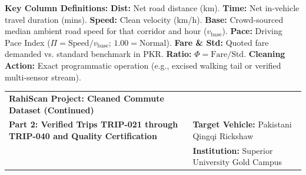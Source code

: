 \documentclass[9pt, a4paper, landscape]{article}
\begin{document}
\vspace{-6pt}

\begin{tcolorbox}[enhanced, colback=softteal, colframe=accentteal, boxrule=0.5pt, arc=2.5pt, left=6pt, right=6pt, top=2.5pt, bottom=2.5pt]
  \scriptsize
  \textbf{Key Column Definitions:} \textbf{Dist:} Net road distance (km). \textbf{Time:} Net in-vehicle travel duration (mins). \textbf{Speed:} Clean velocity (km/h). \textbf{Base:} Crowd-sourced median ambient road speed for that corridor and hour (\(v_{\mathrm{base}}\)). \textbf{Pace:} Driving Pace Index (\(\Pi = \text{Speed}/v_{\mathrm{base}}\); \(1.00 = \text{Normal}\)). \textbf{Fare \& Std:} Quoted fare demanded vs. standard benchmark in PKR. \textbf{Ratio:} \(\Phi = \text{Fare}/\text{Std}\). \textbf{Cleaning Action:} Exact programmatic operation (e.g., excised walking tail or verified multi-sensor stream).
\end{tcolorbox}

\newpage


\begin{tcolorbox}[enhanced, colback=navyblue, colframe=navyblue, arc=3pt, left=8pt, right=8pt, top=4pt, bottom=4pt]
  \begin{tabularx}{\linewidth}{X >{\raggedleft\arraybackslash}p{8.5cm}}
    {\fontsize{13pt}{15pt}\selectfont\color{white}\bfseries RahiScan Project: Cleaned Commute Dataset (Continued)}\\[1.5pt]
    {\fontsize{8.5pt}{10.5pt}\selectfont\color{softteal}\textbf{Part 2: Verified Trips TRIP-021 through TRIP-040 and Quality Certification}} &
    {\fontsize{8pt}{10pt}\selectfont\color{white!90!softblue}\textbf{Target Vehicle:} Pakistani Qingqi Rickshaw}\\[1pt]
    & {\fontsize{8pt}{10pt}\selectfont\color{white!90!softblue}\textbf{Institution:} Superior University Gold Campus}
  \end{tabularx}
\end{tcolorbox}

\vspace{-4pt}
\end{document}
